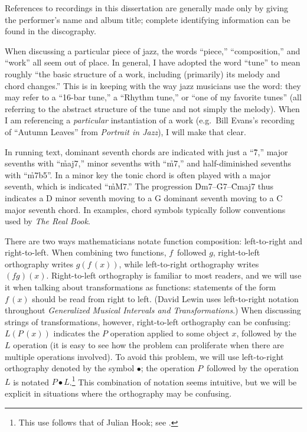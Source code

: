 \singlespacing
References to recordings in this dissertation are generally made only by
giving the performer’s name and album title; complete identifying information
can be found in the discography.

When discussing a particular piece of jazz, the words “piece,” “composition,”
and “work” all seem out of place. In general, I have adopted the word “tune”
to mean roughly “the basic structure of a work, including (primarily) its
melody and chord changes.” This is in keeping with the way jazz musicians use
the word: they may refer to a ``16-bar tune,'' a “Rhythm tune,” or “one
of my favorite tunes” (all referring to the abstract structure of the tune and
not simply the melody). When I am referencing a \emph{particular}
instantiation of a work (e.g.~Bill Evans’s recording of “Autumn Leaves” from
\emph{Portrait in Jazz}), I will make that clear.

In running text, dominant seventh chords are indicated with just a “\h{7},”
major sevenths with “\h{maj7},” minor sevenths with “\h{m7},” and
half-diminished sevenths with “\h{m7b5}”. In a minor key the tonic chord is
often played with a major seventh, which is indicated “\h{mM7}.” The
progression \h{Dm7}--\h{G7}--\h{Cmaj7} thus indicates a D minor seventh moving
to a G dominant seventh moving to a C major seventh chord. In examples, chord
symbols typically follow conventions used by \emph{The Real Book}.

There are two ways mathematicians notate function composition: left-to-right
and right-to-left. When combining two functions, $f\,$ followed $g$,
right-to-left orthography writes $g(f\,(x))$, while left-to-right orthography
writes $(fg)(x)$. Right-to-left orthography is familiar to most readers, and
we will use it when talking about transformations as functions: statements of
the form $f\,(x)$ should be read from right to left. (David Lewin uses
left-to-right notation throughout \emph{Generalized Musical Intervals and
Transformations}.) When discussing strings of transformations, however,
right-to-left orthography can be confusing: $L(P\,(x))$ indicates the $P$
operation applied to some object $x$, followed by the $L$ operation (it is
easy to see how the problem can proliferate when there are multiple operations
involved). To avoid this problem, we will use left-to-right orthography
denoted by the symbol $\bullet$; the operation $P\,$ followed by the operation
$L$ is notated $P \bullet L$.\footnote{This use follows that of Julian Hook; see
.} This combination of notation seems
intuitive, but we will be explicit in situations where the orthography may be
confusing.

\doublespacing


